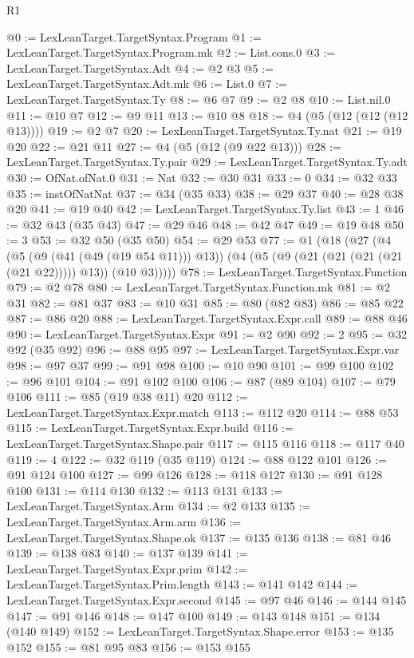 \begin{lexlean}{R1}
\begin{coremodule}
{{{{{{{{{{{{{{{{{{{{{{{{{{{{{{{{{{{{{{{{{{{{{{{{{{{{{{{{{@0 := LexLeanTarget.TargetSyntax.Program
@1 := LexLeanTarget.TargetSyntax.Program.mk
@2 := List.cons.{0}
@3 := LexLeanTarget.TargetSyntax.Adt
@4 := @2 @3
@5 := LexLeanTarget.TargetSyntax.Adt.mk
@6 := List.{0}
@7 := LexLeanTarget.TargetSyntax.Ty
@8 := @6 @7
@9 := @2 @8
@10 := List.nil.{0}
@11 := @10 @7
@12 := @9 @11
@13 := @10 @8
@18 := @4 (@5 (@12 (@12 (@12 @13))))
@19 := @2 @7
@20 := LexLeanTarget.TargetSyntax.Ty.nat
@21 := @19 @20
@22 := @21 @11
@27 := @4 (@5 (@12 (@9 @22 @13)))
@28 := LexLeanTarget.TargetSyntax.Ty.pair
@29 := LexLeanTarget.TargetSyntax.Ty.adt
@30 := OfNat.ofNat.{0}
@31 := Nat
@32 := @30 @31
@33 := 0
@34 := @32 @33
@35 := instOfNatNat
@37 := @34 (@35 @33)
@38 := @29 @37
@40 := @28 @38 @20
@41 := @19 @40
@42 := LexLeanTarget.TargetSyntax.Ty.list
@43 := 1
@46 := @32 @43 (@35 @43)
@47 := @29 @46
@48 := @42 @47
@49 := @19 @48
@50 := 3
@53 := @32 @50 (@35 @50)
@54 := @29 @53
@77 := @1
    (@18
      (@27
        (@4
          (@5 (@9 (@41 (@49 (@19 @54 @11))) @13))
          (@4 (@5 (@9 (@21 (@21 (@21 (@21 (@21 @22))))) @13)) (@10 @3)))))
@78 := LexLeanTarget.TargetSyntax.Function
@79 := @2 @78
@80 := LexLeanTarget.TargetSyntax.Function.mk
@81 := @2 @31
@82 := @81 @37
@83 := @10 @31
@85 := @80 (@82 @83)
@86 := @85 @22
@87 := @86 @20
@88 := LexLeanTarget.TargetSyntax.Expr.call
@89 := @88 @46
@90 := LexLeanTarget.TargetSyntax.Expr
@91 := @2 @90
@92 := 2
@95 := @32 @92 (@35 @92)
@96 := @88 @95
@97 := LexLeanTarget.TargetSyntax.Expr.var
@98 := @97 @37
@99 := @91 @98
@100 := @10 @90
@101 := @99 @100
@102 := @96 @101
@104 := @91 @102 @100
@106 := @87 (@89 @104)
@107 := @79 @106
@111 := @85 (@19 @38 @11) @20
@112 := LexLeanTarget.TargetSyntax.Expr.match
@113 := @112 @20
@114 := @88 @53
@115 := LexLeanTarget.TargetSyntax.Expr.build
@116 := LexLeanTarget.TargetSyntax.Shape.pair
@117 := @115 @116
@118 := @117 @40
@119 := 4
@122 := @32 @119 (@35 @119)
@124 := @88 @122 @101
@126 := @91 @124 @100
@127 := @99 @126
@128 := @118 @127
@130 := @91 @128 @100
@131 := @114 @130
@132 := @113 @131
@133 := LexLeanTarget.TargetSyntax.Arm
@134 := @2 @133
@135 := LexLeanTarget.TargetSyntax.Arm.arm
@136 := LexLeanTarget.TargetSyntax.Shape.ok
@137 := @135 @136
@138 := @81 @46
@139 := @138 @83
@140 := @137 @139
@141 := LexLeanTarget.TargetSyntax.Expr.prim
@142 := LexLeanTarget.TargetSyntax.Prim.length
@143 := @141 @142
@144 := LexLeanTarget.TargetSyntax.Expr.second
@145 := @97 @46
@146 := @144 @145
@147 := @91 @146
@148 := @147 @100
@149 := @143 @148
@151 := @134 (@140 @149)
@152 := LexLeanTarget.TargetSyntax.Shape.error
@153 := @135 @152
@155 := @81 @95 @83
@156 := @153 @155
}}}}}}}}}}}}}}}}}}}}}}}}}}}}}}}}}}}}}}}}}}}}}}}}}}}}}}}}}
\end{coremodule}
\end{lexlean}
